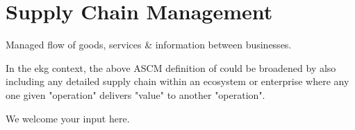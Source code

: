 \section{Supply Chain Management}\label{sec:ekgmm-a-3-3}

Managed flow of goods, services \& information between businesses.


\ekgmmContextSection

In the \gls{ekg} context, the above ASCM definition of  could be broadened
by also including any detailed supply chain within an ecosystem or enterprise where any one given "operation"
delivers "value" to another "operation".


We welcome your input here.

